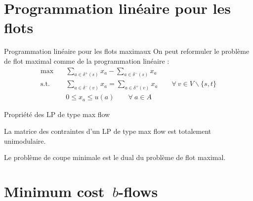 \documentclass{beamer}
\begin{document}


\section{Programmation linéaire pour les flots}

\begin{frame}{Programmation linéaire pour les flots maximaux} \pause
  On peut reformuler le problème de flot maximal comme de la programmation linéaire : \pause
  \begin{align*}
    \max \quad & \sum_{a \in \delta^+(s)} x_a - \sum_{a \in \delta^-(s)} x_a \\
    \mathrm{s.t.} \quad &
      \sum_{a \in \delta^-(v)} x_a = \sum_{a \in \delta^+(v)} x_a \quad \quad \forall~ v \in V \backslash \{s, t\} \\
      & 0 \leq x_a \leq u(a) \quad \quad \forall~ a \in A
  \end{align*}
\end{frame}

\begin{frame}[t]{Propriété des LP de type max flow} \pause
  \begin{proposition}[6.11]
    La matrice des contraintes d'un LP de type max flow est totalement unimodulaire.
  \end{proposition}
  
  \vfill \pause

  \begin{proposition}[6.12]
    Le problème de coupe minimale est le dual du problème de flot maximal.
  \end{proposition}
  
  \vfill
\end{frame}





\section{Minimum cost~$b$-flows}
\end{document}
